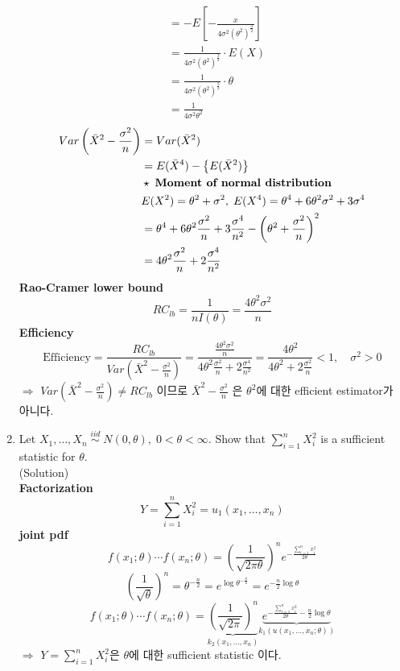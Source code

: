 \documentclass{oblivoir}
\newcommand{\flr}[1]{\left ( #1 \right )}
\newcommand{\slr}[1]{\left \{ #1 \right \}}
\newcommand{\tlr}[1]{\left [ #1 \right]}
\newcommand{\blue}[1]{{\color{blue} #1}}
\begin{document}
\begin{enumerate}
\begin{align*}
&= -E\tlr{- \frac{x}{4\sigma^2 (\theta^2)^{\frac{3}{2}}}} \\
&= \frac{1}{4\sigma^2 (\theta^2)^{\frac{3}{2}}} \cdot E(X) \\
&= \frac{1}{4\sigma^2 (\theta^2)^{\frac{3}{2}}} \cdot \theta \\
&= \frac{1}{4\sigma^2 \theta^2}  
\end{align*}
\begin{align*}
Var\flr{\bar{X}^2 - \frac{\sigma^2}{n}} &= Var(\bar{X}^2) \\
&= E(\bar{X}^4) - \slr{E(\bar{X}^2)} \\
& \star \; \mbox{\textbf{Moment of normal distribution}} \\ 
& E(X^2) = \theta^2 + \sigma^2, \; E(X^4) = \theta^4 + 6 \theta^2 \sigma^2 + 3 \sigma^4 \\
& = \theta^4 + 6 \theta^2 \frac{\sigma^2}{n} + 3 \frac{\sigma^4}{n^2} - \flr{\theta^2 + \frac{\sigma^2}{n}}^2 \\
& =  4\theta^2\frac{\sigma^2}{n} + 2\frac{\sigma^4}{n^2} 
\end{align*}
\textbf{Rao-Cramer lower bound} 
$$
RC_{lb} = \frac{1}{nI(\theta)} = \frac{4\theta^2\sigma^2}{n}
$$
\textbf{Efficiency}
$$
\mbox{Efficiency} = \frac{RC_{lb}}{Var\flr{\bar{X}^2 - \frac{\sigma^2}{n}}} = \frac{\frac{4\theta^2\sigma^2}{n}}{4\theta^2\frac{\sigma^2}{n} + 2\frac{\sigma^4}{n^2} } =  \frac{4\theta^2}{4\theta^2 + 2 \frac{\sigma^2}{n}} < 1, \quad \sigma^2 > 0
$$
$\Rightarrow$ $Var\flr{\bar{X}^2 - \frac{\sigma^2}{n}} \ne RC_{lb}$ 이므로 $\bar{X}^2 - \frac{\sigma^2}{n}$ 은 $\theta^2$에 대한 efficient estimator가 아니다. \\
\vspace{5mm}
\item
Let $X_1, \ldots, X_n \; \overset{iid}{\sim} \; N(0, \theta), \; 0<\theta < \infty$. Show that $\sum_{i=1}^n X_i^2$ is a sufficient
statistic for $\theta$. \\
\blue{(Solution)} \\
\textbf{Factorization} 
$$
Y = \sum_{i=1}^n X_i^2 = u_1 (x_1, \ldots, x_n)
$$
\textbf{joint pdf}
$$
f(x_1;\theta) \cdots f(x_n; \theta) = \flr{\frac{1}{\sqrt{2\pi\theta}}}^n e^{-\frac{\sum_{i=1}^n x_i^2}{2\theta}}
$$
$$
\flr{\frac{1}{\sqrt{\theta}}}^n = \theta^{-\frac{n}{2}} = e^{\log \theta^{-\frac{n}{2}}} = e^{-\frac{n}{2} \log \theta}
$$
$$
f(x_1;\theta) \cdots f(x_n; \theta) = \underset{k_2(x_1, \ldots, x_n)}{\underbrace{\flr{\frac{1}{\sqrt{2\pi}}}^n}} \underset{k_1(u(x_1,\ldots,x_n;\theta))}{\underbrace{e^{-\frac{\sum_{i=1}^n x_i^2}{2\theta}-\frac{n}{2} \log \theta}}}
$$
$\Rightarrow$ $Y = \sum_{i=1}^n X_i^2$은 $\theta$에 대한 sufficient statistic 이다.


\end{enumerate}
\end{document}
